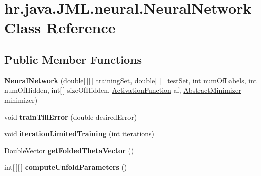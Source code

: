 \hypertarget{classhr_1_1java_1_1_j_m_l_1_1neural_1_1_neural_network}{\section{hr.\+java.\+J\+M\+L.\+neural.\+Neural\+Network Class Reference}
\label{classhr_1_1java_1_1_j_m_l_1_1neural_1_1_neural_network}
}
\subsection*{Public Member Functions}
\begin{DoxyCompactItemize}
\item 
\hypertarget{classhr_1_1java_1_1_j_m_l_1_1neural_1_1_neural_network_a4c7d73c9236cc35114a2f1dda0eb2ca7}{{\bfseries Neural\+Network} (double\mbox{[}$\,$\mbox{]}\mbox{[}$\,$\mbox{]} training\+Set, double\mbox{[}$\,$\mbox{]}\mbox{[}$\,$\mbox{]} test\+Set, int num\+Of\+Labels, int num\+Of\+Hidden, int\mbox{[}$\,$\mbox{]} size\+Of\+Hidden, \hyperlink{classhr_1_1java_1_1_j_m_l_1_1activation_functions_1_1_activation_function}{Activation\+Function} af, \hyperlink{classhr_1_1java_1_1_j_m_l_1_1learning_1_1_abstract_minimizer}{Abstract\+Minimizer} minimizer)}\label{classhr_1_1java_1_1_j_m_l_1_1neural_1_1_neural_network_a4c7d73c9236cc35114a2f1dda0eb2ca7}

\item 
\hypertarget{classhr_1_1java_1_1_j_m_l_1_1neural_1_1_neural_network_a3d05b487280ce8d3f4b51422a47e012c}{void {\bfseries train\+Till\+Error} (double desired\+Error)}\label{classhr_1_1java_1_1_j_m_l_1_1neural_1_1_neural_network_a3d05b487280ce8d3f4b51422a47e012c}

\item 
\hypertarget{classhr_1_1java_1_1_j_m_l_1_1neural_1_1_neural_network_a59b297e03c2eb941d21abcee66a9723f}{void {\bfseries iteration\+Limited\+Training} (int iterations)}\label{classhr_1_1java_1_1_j_m_l_1_1neural_1_1_neural_network_a59b297e03c2eb941d21abcee66a9723f}

\item 
\hypertarget{classhr_1_1java_1_1_j_m_l_1_1neural_1_1_neural_network_a5e34cbf0f22a97389d219344a2d96f61}{Double\+Vector {\bfseries get\+Folded\+Theta\+Vector} ()}\label{classhr_1_1java_1_1_j_m_l_1_1neural_1_1_neural_network_a5e34cbf0f22a97389d219344a2d96f61}

\item 
\hypertarget{classhr_1_1java_1_1_j_m_l_1_1neural_1_1_neural_network_a46ce5f1a17a3c3d0cd92fb1c985b5d47}{int\mbox{[}$\,$\mbox{]}\mbox{[}$\,$\mbox{]} {\bfseries compute\+Unfold\+Parameters} ()}\label{classhr_1_1java_1_1_j_m_l_1_1neural_1_1_neural_network_a46ce5f1a17a3c3d0cd92fb1c985b5d47}

\end{DoxyCompactItemize}
